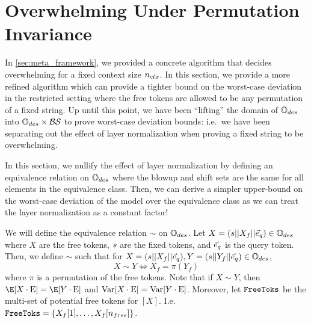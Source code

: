 
\section{Overwhelming Under Permutation Invariance}
\label{sec:perm_invar}
In \cref{sec:meta_framework}, we provided a concrete algorithm that decides overwhelming for a fixed context size ${n_{ctx}}$.
In this section, we provide a more refined algorithm which can provide a tighter bound on the worst-case deviation in the restricted setting where the free tokens are allowed to be any permutation of a fixed string.
Up until this point, we have been ``lifting'' the domain of $\mathbb{O}_{des}$ into $\mathbb{O}_{des} \times \mathcal{B} \mathcal{S}$ to prove worst-case deviation bounds: i.e.\ we have been separating out the effect of layer normalization when proving a fixed string to be overwhelming.

In this section, we nullify the effect of layer normalization by defining an equivalence relation on $\mathbb{O}_{des}$ where the blowup and shift sets are the same for all elements in the equivalence class.
Then, we can derive a simpler upper-bound on the worst-case deviation of the model over the equivalence class as we can treat the layer normalization as a constant factor!

\begin{definition}
	We will define the equivalence relation \(\sim\) on \(\mathbb{O}_{des}\).
	Let $X = ({s} || X_f || \vec{e}_q) \in \mathbb{O}_{des}$ where $X$ are the free tokens, ${s}$ are the fixed tokens, and $\vec{e}_q$ is the query token.
	Then, we define \(\sim\) such that for $X = ({s} || X_f || \vec{e}_q), Y = ({s} || Y_f || \vec{e}_q) \in \mathbb{O}_{des}$,
	\[
		X \sim Y \iff X_f = \pi(Y_f)
	\]
	where $\pi$ is a permutation of the free tokens.
	Note that if $X \sim Y$, then $\E[X \cdot \Embed] = \E[Y \cdot \Embed]$ and $\mathrm{Var}[X \cdot \text{E}] = \mathrm{Var}[Y \cdot \text{E}]$.
    Moreover, let $\texttt{FreeToks}$ be the multi-set of potential free tokens for $[X]$.
    I.e. $\texttt{FreeToks} = \{X_f[1], \dots, X_f[n_{free}]\}$.
\end{definition}

